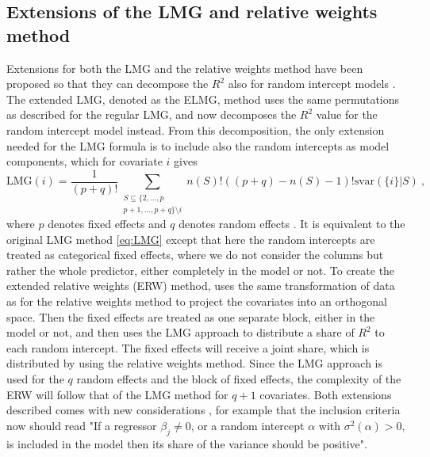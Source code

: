 \subsection{Extensions of the LMG and relative weights method}
Extensions for both the LMG and the relative weights method have been proposed so that they can decompose the $R^2$ also for random intercept models \citep{matre}. 
The extended LMG, denoted as the ELMG, method uses the same permutations as described for the regular LMG, and now decomposes the $R^2$ value for the random intercept model instead.
From this decomposition, the only extension needed for the LMG formula is to include also the random intercepts as model components, which for covariate $i$ gives
\begin{equation}
    \text{LMG}(i) = \frac{1}{(p+q)!} \sum_{\substack{S \subseteq \{2, ..., p \\ p+1, ..., p+q\} \setminus i }} n(S)! ((p+q) - n(S)-1)! \text{svar}(\{i\} \lvert S) \ , 
\end{equation}
where $p$ denotes fixed effects and $q$ denotes random effects \citep{matre}. It is equivalent to the original LMG method \eqref{eq:LMG} except that here the random intercepts are treated as categorical fixed effects, where we do not consider the columns but rather the whole predictor, either completely in the model or not.
\newline
\newline
To create the extended relative weights (ERW) method, \citet{matre} uses the same transformation of data as for the relative weights method to project the covariates into an orthogonal space. 
Then the fixed effects are treated as one separate block, either in the model or not, and then uses the LMG approach to distribute a share of $R^2$ to each random intercept.
The fixed effects will receive a joint share, which is distributed by using the relative weights method.
Since the LMG approach is used for the $q$ random effects and the block of fixed effects, the complexity of the ERW will follow that of the LMG method for $q+1$ covariates.
\newline 
\newline
Both extensions described comes with new considerations \citep[for full details]{matre}, for example that the inclusion criteria now should read "If a regressor $\beta_j \neq 0$, or a random intercept $\alpha$ with $\sigma^2(\alpha) > 0$, is included in the model then its share of the variance should be positive".



